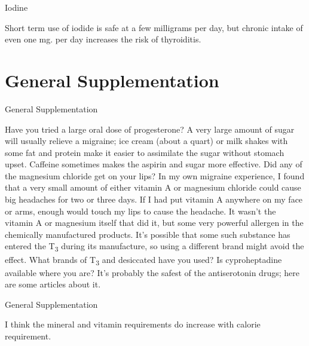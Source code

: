 \documentclass[11pt,oneside,openany,extrafontsizes]{memoir}
\begin{document}
\begin{standalonequote}{Iodine}

    \begin{answer}
        Short term use of iodide is safe at a few milligrams per day, but chronic intake of even one mg. per day increases the risk of thyroiditis.
    \end{answer}
\end{standalonequote}

\section{General Supplementation}

\begin{standalonequote}{General Supplementation}

    \begin{answer}
        Have you tried a large oral dose of progesterone? A very large amount of sugar will usually relieve a migraine; ice cream (about a quart) or milk shakes with some fat and protein make it easier to assimilate the sugar without stomach upset. Caffeine sometimes makes the aspirin and sugar more effective. Did any of the magnesium chloride get on your lips? In my own migraine experience, I found that a very small amount of either vitamin A or magnesium chloride could cause big headaches for two or three days. If I had put vitamin A anywhere on my face or arms, enough would touch my lips to cause the headache. It wasn't the vitamin A or magnesium itself that did it, but some very powerful allergen in the chemically manufactured products. It's possible that some such substance has entered the T\textsubscript{3} during its manufacture, so using a different brand might avoid the effect. What brands of T\textsubscript{3} and desiccated have you used? Is cyproheptadine available where you are? It's probably the safest of the antiserotonin drugs; here are some articles about it.
    \end{answer}
\end{standalonequote}

\begin{standalonequote}{General Supplementation}

    \begin{answer}
        I think the mineral and vitamin requirements do increase with calorie requirement.
    \end{answer}
\end{standalonequote}
\end{document}
